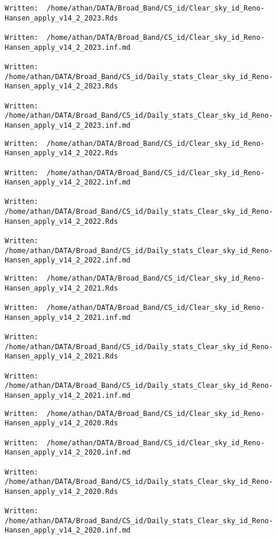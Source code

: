 \documentclass[
  10pt,
  a4paper,oneside]{article}
\begin{document}
\begin{verbatim}
Written:  /home/athan/DATA/Broad_Band/CS_id/Clear_sky_id_Reno-Hansen_apply_v14_2_2023.Rds 

Written:  /home/athan/DATA/Broad_Band/CS_id/Clear_sky_id_Reno-Hansen_apply_v14_2_2023.inf.md 

Written:  /home/athan/DATA/Broad_Band/CS_id/Daily_stats_Clear_sky_id_Reno-Hansen_apply_v14_2_2023.Rds 

Written:  /home/athan/DATA/Broad_Band/CS_id/Daily_stats_Clear_sky_id_Reno-Hansen_apply_v14_2_2023.inf.md 
\end{verbatim}

\begin{verbatim}
Written:  /home/athan/DATA/Broad_Band/CS_id/Clear_sky_id_Reno-Hansen_apply_v14_2_2022.Rds 

Written:  /home/athan/DATA/Broad_Band/CS_id/Clear_sky_id_Reno-Hansen_apply_v14_2_2022.inf.md 

Written:  /home/athan/DATA/Broad_Band/CS_id/Daily_stats_Clear_sky_id_Reno-Hansen_apply_v14_2_2022.Rds 

Written:  /home/athan/DATA/Broad_Band/CS_id/Daily_stats_Clear_sky_id_Reno-Hansen_apply_v14_2_2022.inf.md 
\end{verbatim}

\begin{verbatim}
Written:  /home/athan/DATA/Broad_Band/CS_id/Clear_sky_id_Reno-Hansen_apply_v14_2_2021.Rds 

Written:  /home/athan/DATA/Broad_Band/CS_id/Clear_sky_id_Reno-Hansen_apply_v14_2_2021.inf.md 

Written:  /home/athan/DATA/Broad_Band/CS_id/Daily_stats_Clear_sky_id_Reno-Hansen_apply_v14_2_2021.Rds 

Written:  /home/athan/DATA/Broad_Band/CS_id/Daily_stats_Clear_sky_id_Reno-Hansen_apply_v14_2_2021.inf.md 
\end{verbatim}

\begin{verbatim}
Written:  /home/athan/DATA/Broad_Band/CS_id/Clear_sky_id_Reno-Hansen_apply_v14_2_2020.Rds 

Written:  /home/athan/DATA/Broad_Band/CS_id/Clear_sky_id_Reno-Hansen_apply_v14_2_2020.inf.md 

Written:  /home/athan/DATA/Broad_Band/CS_id/Daily_stats_Clear_sky_id_Reno-Hansen_apply_v14_2_2020.Rds 

Written:  /home/athan/DATA/Broad_Band/CS_id/Daily_stats_Clear_sky_id_Reno-Hansen_apply_v14_2_2020.inf.md 
\end{verbatim}
\end{document}
